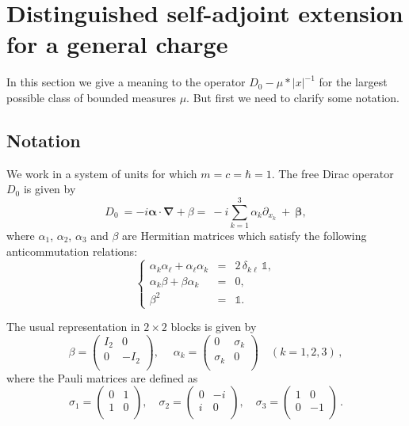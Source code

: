 \documentclass[10pt]{amsart}
\theoremstyle{definition}
\newcommand{\bfbeta}{\boldsymbol{\beta}}
\newcommand{\bfalpha}{\boldsymbol{\alpha}}
\newcommand{\bfnabla}{\boldsymbol{\nabla}}
\newcommand\1{{\ensuremath {\mathds 1} }}
\begin{document}
\section{Distinguished self-adjoint extension for a general charge}\label{sec:self-adjointness}

In this section we give a meaning to the operator $D_0-\mu\ast|x|^{-1}$ for the largest possible class of bounded measures $\mu$. But first we need to clarify some notation.

\subsection{Notation}
We work in a system of units for which $m=c=\hbar=1$. The free Dirac operator $D_0$ is given by
\begin{equation}\label{eq:def_Dirac}
D_0\ = -i\bfalpha\cdot\bfnabla + \beta = \ - i\sum^3_{k=1} \alpha_k \partial_{x_k} \ + \ \bfbeta,
\end{equation}
where $\alpha_1$, $\alpha_2$, $\alpha_3$ and $\beta$ are Hermitian matrices which satisfy the following anticommutation relations:
\begin{equation}\label{CAR}
\left\lbrace
\begin{array}{rcl}
{\alpha}_k {\alpha}_\ell + {\alpha}_\ell {\alpha}_k & = & 2\,\delta_{k\ell}\,\1,\\
{\alpha}_k {\beta} + {\beta} {\alpha}_k & = & 0,\\
\beta^2 & = & \1.
\end{array} \right.
\end{equation}

\noindent The usual representation in $2\times 2$ blocks is given by
\[
\beta=
\begin{pmatrix} I_2 & 0 \\ 0 & -I_2 \\
\end{pmatrix},\quad \; \alpha_k=
\begin{pmatrix}
0 &\sigma_k \\ \sigma_k &0 \\
\end{pmatrix} \quad (k=1, 2, 3)\,,
\]
where the Pauli matrices are defined as
\[
\sigma _1=
\begin{pmatrix} 0 & 1
\\ 1 & 0 \\
\end{pmatrix},\quad \sigma_2=
\begin{pmatrix} 0 & -i \\
i & 0 \\
\end{pmatrix},\quad \sigma_3=
\begin{pmatrix} 1 & 0\\ 0 &-1\\
\end{pmatrix} \,.
\]
\end{document}
